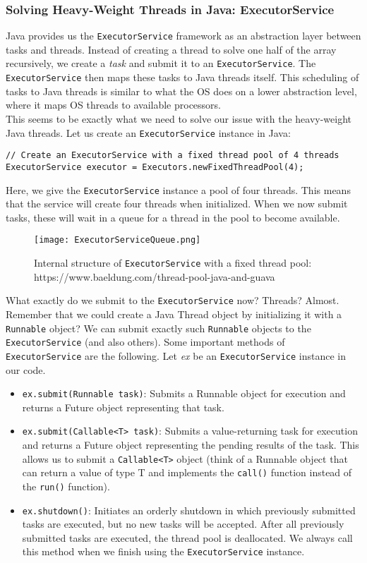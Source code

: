 \documentclass[main.tex]{subfiles}
\begin{document}
\subsubsection{Solving Heavy-Weight Threads in Java: ExecutorService}
\label{ExecutorService}
Java provides us the \texttt{ExecutorService} framework as an abstraction layer between tasks and threads. Instead of creating a thread to solve one half of the array recursively, we create a \textit{task} and submit it to an \texttt{ExecutorService}. The \texttt{ExecutorService} then maps these tasks to Java threads itself. This scheduling of tasks to Java threads is similar to what the OS does on a lower abstraction level, where it maps OS threads to available processors.\\[3mm]
This seems to be exactly what we need to solve our issue with the heavy-weight Java threads. Let us create an \texttt{ExecutorService} instance in Java:
\begin{verbatim}
// Create an ExecutorService with a fixed thread pool of 4 threads
ExecutorService executor = Executors.newFixedThreadPool(4);
\end{verbatim}
\noindent Here, we give the \texttt{ExecutorService} instance a pool of four threads. This means that the service will create four threads when initialized. When we now submit tasks, these will wait in a queue for a thread in the pool to become available.
\begin{figure}[H]
    \centering
    \texttt{[image: ExecutorServiceQueue.png]}
    \caption{Internal structure of \texttt{ExecutorService} with a fixed thread pool: https://www.baeldung.com/thread-pool-java-and-guava}
\end{figure}
\noindent What exactly do we submit to the \texttt{ExecutorService} now? Threads? Almost. Remember that we could create a Java Thread object by initializing it with a \texttt{Runnable} object? We can submit exactly such \texttt{Runnable} objects to the \texttt{ExecutorService} (and also others). Some important methods of \texttt{ExecutorService} are the following. Let \textit{ex} be an \texttt{ExecutorService} instance in our code.
\begin{itemize}
  \item \texttt{ex.submit(Runnable task)}: Submits a Runnable object for execution and returns a Future object representing that task.
  \item \texttt{ex.submit(Callable<T> task)}: Submits a value-returning task for execution and returns a Future object representing the pending results of the task. This allows us to submit a \texttt{Callable<T>} object (think of a Runnable object that can return a value of type T and implements the \texttt{call()} function instead of the \texttt{run()} function).
  \item \texttt{ex.shutdown()}: Initiates an orderly shutdown in which previously submitted tasks are executed, but no new tasks will be accepted. After all previously submitted tasks are executed, the thread pool is deallocated. We always call this method when we finish using the \texttt{ExecutorService} instance.
\end{itemize}
\end{document}
